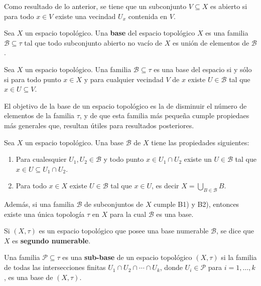 \documentclass[12pt]{report}
\theoremstyle{largebreak}
\newcommand{\eul}[1]{\ensuremath{\mathscr{#1}}}
\renewcommand{\theenumi}{\arabic{enumi})}
\begin{document}
    Como resultado de lo anterior, se tiene que un subconjunto $V\subseteq X$ es abierto si para todo $x\in V$ existe una vecindad $U_x$ contenida en $V$.

    \begin{mydef}
        Sea $X$ un espacio topológico. Una \textbf{base} del espacio topológico $X$ es una familia $\eul{B}\subseteq\tau$ tal que todo subconjunto abierto no vacío de $X$ es unión de elementos de $\eul{B}$.
    \end{mydef}

    \begin{propo}
        Sea $X$ un espacio topológico. Una familia $\eul{B}\subseteq\tau$ es una base del espacio si y sólo si para todo punto $x\in X$ y para cualquier vecindad $V$ de $x$ existe $U\in\eul{B}$ tal que $x\in U\subseteq V$.
    \end{propo}

    El objetivo de la base de un espacio topológico es la de disminuir el número de elementos de la familia $\tau$, y de que esta familia más pequeña cumple propiedaes más generales que, resultan útiles para resultados posteriores.

    \begin{propo}
        Sea $X$ un espacio topológico. Una base $\eul{B}$ de $X$ tiene las propiedades siguientes:
        \renewcommand{\theenumi}{B\arabic{enumi})}
        \begin{enumerate}
            \item Para cualesquier $U_1, U_2\in\eul{B}$ y todo punto $x\in U_1\cap U_2$ existe un $U\in\eul{B}$ tal que $x\in U\subseteq U_1\cap U_2$.
            \item Para todo $x\in X$ existe $U\in\eul{B}$ tal que $x\in U$, es decir $X=\bigcup_{B\in\eul{B}}B$.
        \end{enumerate}
        \renewcommand{\theenumi}{\arabic{enumi})}
        Además, si una familia $\eul{B}$ de subconjuntos de $X$ cumple B1) y B2), entonces existe una única topología $\tau$ en $X$ para la cual $\eul{B}$ es una base.
    \end{propo}

    \begin{mydef}
        Si $(X,\tau)$ es un espacio topológico que posee una base numerable $\eul{B}$, se dice que $X$ es \textbf{segundo numerable}.
    \end{mydef}

    Una familia $\eul{P}\subseteq\tau$ es una \textbf{sub-base} de un espacio topológico $(X,\tau)$ si la familia de todas las intersecciones finitas $U_1\cap U_2\cap\cdots\cap U_k$, donde $U_i\in\eul{P}$ para $i=1,\dots,k$, es una base de $(X,\tau)$.\
\end{document}
